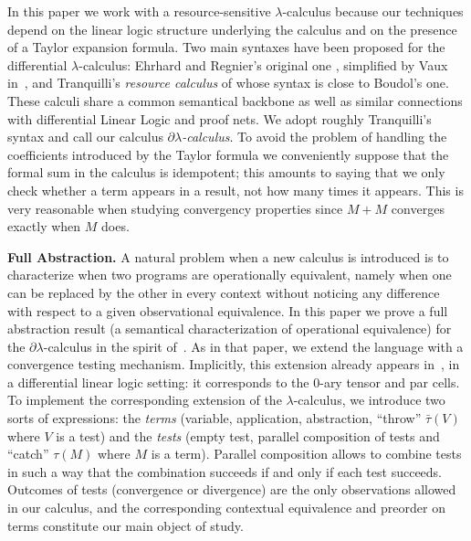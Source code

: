 \documentclass{LMCS}
\newcommand{\dlam}{\ensuremath{\partial\lambda}}
\newcommand{\lam}{\ensuremath{\lambda}}
\newcommand{\gto}{\ensuremath{\bar\tau}}
\begin{document}
In this paper we work with a resource-sensitive \lam-calculus because our techniques depend on the linear logic structure underlying the calculus and on the presence
 of a Taylor expansion formula. Two main syntaxes have been proposed for the differential $\lambda$-calculus: Ehrhard and Regnier's original one \cite{EhrhardR03},
 simplified by Vaux in~\cite{Vaux07}, and Tranquilli's \emph{resource calculus} of \cite{Tranquilli10} whose syntax  is close to Boudol's one.
 These calculi share a common semantical backbone as well as similar connections with differential Linear Logic and proof nets. 
We adopt roughly Tranquilli's syntax and call our calculus  \emph{\dlam-calculus}. To avoid the problem of handling the coefficients introduced by the Taylor formula 
 we conveniently suppose that the formal sum in the calculus is idempotent; this amounts to saying that we only check whether a term appears in a result, not how many
 times it appears. This is very reasonable when studying convergency properties since $M + M$ converges exactly when $M$ does.


\medskip
{\bf Full Abstraction.} 
A natural problem when a new calculus is introduced is to characterize when two programs are operationally equivalent, 
namely when one can be replaced by the other in every context without noticing any difference with respect to a given observational equivalence. 
In this paper we prove a full abstraction result (a semantical characterization of operational equivalence)
for the \dlam-calculus in the spirit of~\cite{BoudolCL99}. As in that paper, we extend the 
language with a convergence testing mechanism. 
Implicitly, this extension already appears in~\cite{EhrhardL10}, in a differential linear logic setting: it corresponds to the
$0$-ary tensor and par cells. To implement the corresponding extension of the 
$\lambda$-calculus, we
introduce two sorts of expressions: the \emph{terms} (variable, application,
abstraction, ``throw'' $\gto(V)$ where  $V$ is a test) and the \emph{tests}
(empty test, parallel composition of tests and 
``catch'' $\tau(M)$ where  $M$ is a term).
Parallel composition allows to combine tests in such a way that
the combination succeeds if and only if each test succeeds. 
Outcomes of tests (convergence or divergence) are the only observations
allowed in our calculus, and the corresponding contextual equivalence and preorder on terms
constitute our main object of study.
\end{document}
